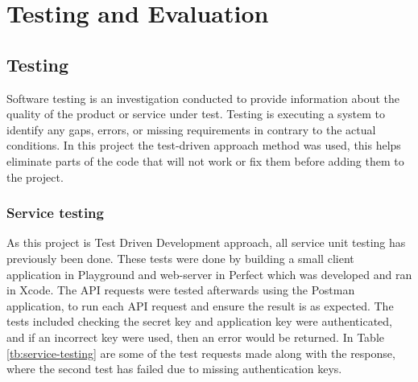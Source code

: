 \chapter{Testing and Evaluation}

\section{Testing}

Software testing is an investigation conducted to provide information about the quality of the product or service under test. Testing is executing a system to identify any gaps, errors, or missing requirements in contrary to the actual conditions. In this project the test-driven approach method was used, this helps eliminate parts of the code that will not work or fix them before adding them to the project.

\subsection{Service testing}

As this project is Test Driven Development approach, all service unit testing has previously been done. These tests were done by building a small client application in Playground and web-server in Perfect which was developed and ran in Xcode. The API requests were tested afterwards using the Postman application, to run each API request and ensure the result is as expected. The tests included checking the secret key and application key were authenticated, and if an incorrect key were used, then an error would be returned.  In Table \ref{tb:service-testing} are some of the test requests made along with the response, where the second test has failed due to missing authentication keys.

